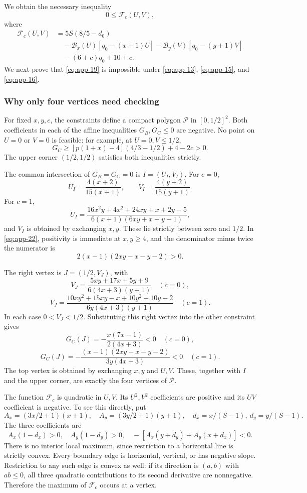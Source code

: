 \documentclass[11pt,reqno]{amsart}
\theoremstyle{plain}
\begin{document}
We obtain the necessary inequality \[
\boxed{0\le\mathcal F_c(U,V),}
\tag{B.19}\label{eq:app-19}
\] where \[
\begin{aligned}
\mathcal F_c(U,V)
&=5S(8/5-d_0)\\
&\quad-\mathcal B_x(U)[q_0-(x+1)U]
      -\mathcal B_y(V)[q_0-(y+1)V]\\
&\quad-(6+c)q_0+10+c.
\end{aligned}
\tag{B.20}\label{eq:app-20}
\] We next prove that \eqref{eq:app-19} is impossible under \eqref{eq:app-13}, \eqref{eq:app-15}, and \eqref{eq:app-16}.

\subsubsection*{Why only four vertices need checking}\label{why-only-four-vertices-need-checking}

For fixed \(x,y,c\), the constraints define a compact polygon \(\mathcal P\) in \([0,1/2]^2\). Both coefficients in each of the affine inequalities \(G_B,G_C\le0\) are negative. No point on \(U=0\) or \(V=0\) is feasible: for example, at \(U=0,V\le1/2\), \[
G_C\ge[p(1+x)-4](4/3-1/2)+4-2c>0.
\] The upper corner \((1/2,1/2)\) satisfies both inequalities strictly.

The common intersection of \(G_B=G_C=0\) is \(I=(U_I,V_I)\). For \(c=0\), \[
U_I=\frac{4(x+2)}{15(x+1)},\qquad
V_I=\frac{4(y+2)}{15(y+1)}.
\tag{B.21}\label{eq:app-21}
\] For \(c=1\), \[
U_I=\frac{16x^2y+4x^2+24xy+x+2y-5}
 {6(x+1)(6xy+x+y-1)},
\tag{B.22}\label{eq:app-22}
\] and \(V_I\) is obtained by exchanging \(x,y\). These lie strictly between zero and \(1/2\). In \eqref{eq:app-22}, positivity is immediate at \(x,y\ge4\), and the denominator minus twice the numerator is \[
2(x-1)(2xy-x-y-2)>0.
\]

The right vertex is \(J=(1/2,V_J)\), with \[
V_J=\frac{5xy+17x+5y+9}{6(4x+3)(y+1)}\quad(c=0),
\tag{B.23}\label{eq:app-23}
\] \[
V_J=\frac{10xy^2+15xy-x+10y^2+10y-2}
 {6y(4x+3)(y+1)}\quad(c=1).
\tag{B.24}\label{eq:app-24}
\] In each case \(0<V_J<1/2\). Substituting this right vertex into the other constraint gives \[
G_C(J)=-\frac{x(7x-1)}{2(4x+3)}<0\quad(c=0),
\] \[
G_C(J)=-\frac{(x-1)(2xy-x-y-2)}{3y(4x+3)}<0\quad(c=1).
\] The top vertex is obtained by exchanging \(x,y\) and \(U,V\). These, together with \(I\) and the upper corner, are exactly the four vertices of \(\mathcal P\).

The function \(\mathcal F_c\) is quadratic in \(U,V\). Its \(U^2,V^2\) coefficients are positive and its \(UV\) coefficient is negative. To see this directly, put \[
A_x=(3x/2+1)(x+1),\quad A_y=(3y/2+1)(y+1),
\quad d_x=x/(S-1),\ d_y=y/(S-1).
\] The three coefficients are \[
A_x(1-d_x)>0,\quad A_y(1-d_y)>0,
\quad-[A_x(y+d_y)+A_y(x+d_x)]<0.
\] There is no interior local maximum, since restriction to a horizontal line is strictly convex. Every boundary edge is horizontal, vertical, or has negative slope. Restriction to any such edge is convex as well: if its direction is \((a,b)\) with \(ab\le0\), all three quadratic contributions to its second derivative are nonnegative. Therefore the maximum of \(\mathcal F_c\) occurs at a vertex.
\end{document}
